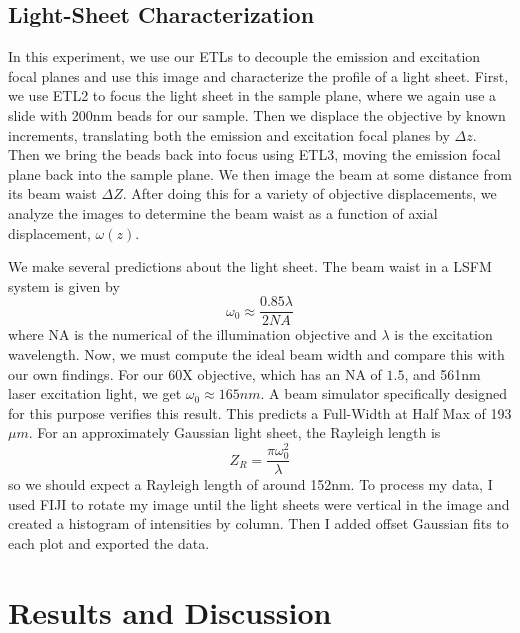 \subsection{Light-Sheet Characterization}
In this experiment, we use our ETLs to decouple the emission and excitation focal planes and use this image and characterize the profile of a light sheet. First, we use ETL2 to focus the light sheet in the sample plane, where we again use a slide with 200nm beads for our sample. Then we displace the objective by known increments, translating both the emission and excitation focal planes by $\Delta z$. Then we bring the beads back into focus using ETL3, moving the emission focal plane back into the sample plane. We then image the beam at some distance from its beam waist $\Delta Z.$ After doing this for a variety of objective displacements, we analyze the images to determine the beam waist as a function of axial displacement, $\omega(z)$. \par
We make several predictions about the light sheet. The beam waist in a LSFM system is given by \cite{Ernst}
\begin{equation}
    \omega_0 \approx \frac{0.85 \lambda}{2 NA}
\end{equation}
where NA is the numerical of the illumination objective and $\lambda$ is the excitation wavelength. Now, we must compute the ideal beam width and compare this with our own findings. For our 60X objective, which has an NA of $1.5$, and 561nm laser excitation light, we get $\omega_0 \approx 165nm.$ A beam simulator specifically designed for this purpose \cite{Remacha} verifies this result. This predicts a Full-Width at Half Max of 193$\mu m$. For an approximately Gaussian light sheet, the Rayleigh length is
\begin{equation}
	Z_R = \frac{\pi \omega_0^2}{\lambda}
\end{equation}
so we should expect a Rayleigh length of around 152nm. To process my data, I used FIJI \cite{Fiji} to rotate my image until the light sheets were vertical in the image and created a histogram of intensities by column. Then I added offset Gaussian fits to each plot and exported the data.
\section{Results and Discussion}
